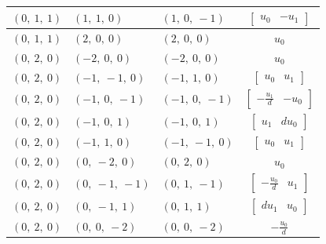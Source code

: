 \documentclass[11pt]{article}
\theoremstyle{definition}
\begin{document}
\begin{longtable}{|l|l|l|c|}
    \hline
    $\left( 0, \  1, \  1\right)$ & $\left( 1, \  1, \  0\right)$ & $\left( 1, \  0, \  -1\right)$ & $\left[\begin{matrix}u_{0} & - u_{1}\end{matrix}\right]$ \\
    \hline
    $\left( 0, \  1, \  1\right)$ & $\left( 2, \  0, \  0\right)$ & $\left( 2, \  0, \  0\right)$ & $u_{0}$ \\
    \hline
    $\left( 0, \  2, \  0\right)$ & $\left( -2, \  0, \  0\right)$ & $\left( -2, \  0, \  0\right)$ & $u_{0}$ \\
    \hline
    $\left( 0, \  2, \  0\right)$ & $\left( -1, \  -1, \  0\right)$ & $\left( -1, \  1, \  0\right)$ & $\left[\begin{matrix}u_{0} & u_{1}\end{matrix}\right]$ \\
    \hline
    $\left( 0, \  2, \  0\right)$ & $\left( -1, \  0, \  -1\right)$ & $\left( -1, \  0, \  -1\right)$ & $\left[\begin{matrix}- \frac{u_{1}}{d} & - u_{0}\end{matrix}\right]$ \\
    \hline
    $\left( 0, \  2, \  0\right)$ & $\left( -1, \  0, \  1\right)$ & $\left( -1, \  0, \  1\right)$ & $\left[\begin{matrix}u_{1} & d u_{0}\end{matrix}\right]$ \\
    \hline
    $\left( 0, \  2, \  0\right)$ & $\left( -1, \  1, \  0\right)$ & $\left( -1, \  -1, \  0\right)$ & $\left[\begin{matrix}u_{0} & u_{1}\end{matrix}\right]$ \\
    \hline
    $\left( 0, \  2, \  0\right)$ & $\left( 0, \  -2, \  0\right)$ & $\left( 0, \  2, \  0\right)$ & $u_{0}$ \\
    \hline
    $\left( 0, \  2, \  0\right)$ & $\left( 0, \  -1, \  -1\right)$ & $\left( 0, \  1, \  -1\right)$ & $\left[\begin{matrix}- \frac{u_{0}}{d} & u_{1}\end{matrix}\right]$ \\
    \hline
    $\left( 0, \  2, \  0\right)$ & $\left( 0, \  -1, \  1\right)$ & $\left( 0, \  1, \  1\right)$ & $\left[\begin{matrix}d u_{1} & u_{0}\end{matrix}\right]$ \\
    \hline
    $\left( 0, \  2, \  0\right)$ & $\left( 0, \  0, \  -2\right)$ & $\left( 0, \  0, \  -2\right)$ & $- \frac{u_{0}}{d}$ \\

\end{longtable}
\end{document}
